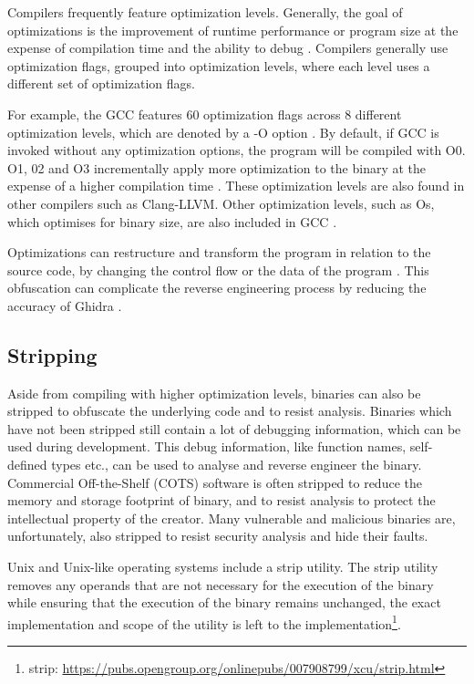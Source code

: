 Compilers frequently feature optimization levels. Generally, the goal of optimizations is the improvement of runtime performance or program size at the expense of compilation time and the ability to debug \cite{ColeOptimizationLevel}. Compilers generally use optimization flags, grouped into optimization levels, where each level uses a different set of optimization flags.

For example, the GCC features 60 optimization flags across 8 different optimization levels, which are denoted by a -O option \cite{ColeOptimizationLevel, gccOptimization}. By default, if GCC is invoked without any optimization options, the program will be compiled with O0. O1, 02 and O3 incrementally apply more optimization to the binary at the expense of a higher compilation time \cite{gccOptimization}. These optimization levels are also found in other compilers such as Clang-LLVM. Other optimization levels, such as Os, which optimises for binary size, are also included in GCC \cite{gccOptimization}.

Optimizations can restructure and transform the program in relation to the source code, by changing the control flow or the data of the program \cite{optimizationObfuscation}. This obfuscation can complicate the reverse engineering process by reducing the accuracy of Ghidra \cite{optimizationObfuscation}.  

\subsection{Stripping}
Aside from compiling with higher optimization levels, binaries can also be stripped to obfuscate the underlying code and to resist analysis\cite{StochFuzz}. Binaries which have not been stripped still contain a lot of debugging information, which can be used during development. This debug information, like function names, self-defined types etc., can be used to analyse and reverse engineer the binary. Commercial Off-the-Shelf (COTS) software is often stripped to reduce the memory and storage footprint of binary, and to resist analysis to protect the intellectual property of the creator. Many vulnerable and malicious binaries are, unfortunately, also stripped to resist security analysis and hide their faults\cite{Debin}.

Unix and Unix-like operating systems include a strip utility. The strip utility removes any operands that are not necessary for the execution of the binary while ensuring that the execution of the binary remains unchanged, the exact implementation and scope of the utility is left to the implementation\footnote{strip: \url{https://pubs.opengroup.org/onlinepubs/007908799/xcu/strip.html}}. 

